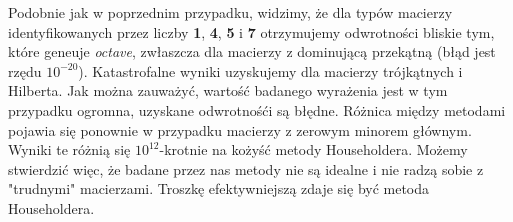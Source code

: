 Podobnie jak w poprzednim przypadku, widzimy, że dla typów macierzy identyfikowanych przez liczby \textbf{1}, \textbf{4}, \textbf{5} i \textbf{7}
otrzymujemy odwrotności bliskie tym, które geneuje \textit{octave}, zwłaszcza dla macierzy z dominującą przekątną (błąd jest rzędu $10^{-20}$).
Katastrofalne wyniki uzyskujemy dla macierzy trójkątnych i Hilberta. Jak można zauważyć, wartość badanego wyrażenia jest w tym przypadku ogromna,
uzyskane odwrotnośći są błędne. Różnica między metodami pojawia się ponownie w przypadku macierzy z zerowym minorem głównym. Wyniki te różnią się 
$10^{12}$-krotnie na kożyść metody Householdera. Możemy stwierdzić więc, że badane przez nas metody nie są idealne i nie radzą sobie z
"trudnymi" macierzami. Troszkę efektywniejszą zdaje się być metoda Householdera.
 


 



